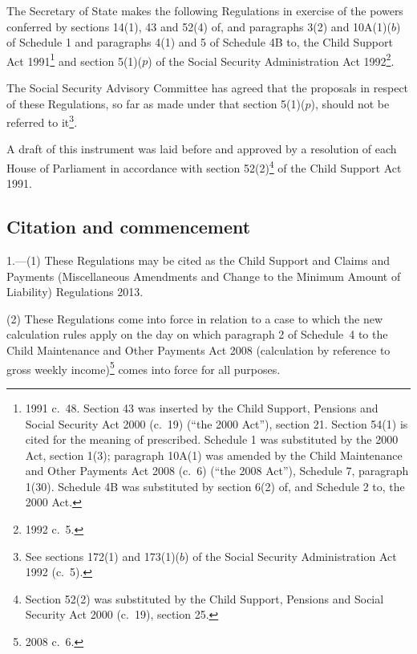 \documentclass[12pt,a4paper]{article}
\title{\regstitle}
\author{S.I.\ 2013 No.\ 1654}
\date{Made
3rd July 2013\\
Coming into force
in accordance with regulation 1
}
\begin{document}
\maketitle

\enlargethispage{\baselineskip}

\noindent
The Secretary of State makes the following Regulations in exercise of the powers conferred by sections 14(1), 43 and 52(4) of, and paragraphs 3(2) and 10A(1)($b$)  of Schedule 1 and paragraphs 4(1) and 5 of Schedule 4B to, the Child Support Act 1991\footnote{1991 c.~48. Section 43 was inserted by the Child Support, Pensions and Social Security Act 2000 (c.~19) (“the 2000 Act”), section 21. Section 54(1) is cited for the meaning of prescribed. Schedule 1 was substituted by the 2000 Act, section 1(3); paragraph 10A(1) was amended by the Child Maintenance and Other Payments Act 2008 (c.~6) (“the 2008 Act”), Schedule 7, paragraph 1(30). Schedule 4B was substituted by section 6(2) of, and Schedule 2 to, the 2000 Act.} and section 5(1)($p$)  of the Social Security Administration Act 1992\footnote{1992 c.~5.}.

The Social Security Advisory Committee has agreed that the proposals in respect of these Regulations, so far as made under that section 5(1)($p$), should not be referred to it\footnote{See sections 172(1) and 173(1)($b$)  of the Social Security Administration Act 1992 (c.~5).}.

A draft of this instrument was laid before and approved by a resolution of each House of Parliament in accordance with section 52(2)\footnote{Section 52(2) was substituted by the Child Support, Pensions and Social Security Act 2000 (c.~19), section 25.} of the Child Support Act 1991. 

{\sloppy

\tableofcontents

}

\bigskip

\setcounter{secnumdepth}{-2}

\subsection[1. Citation and commencement]{Citation and commencement}

1.---(1)  These Regulations may be cited as the Child Support and Claims and Payments (Miscellaneous Amendments and Change to the Minimum Amount of Liability) Regulations 2013.

(2) These Regulations come into force in relation to a case to which the new calculation rules apply on the day on which paragraph 2 of Schedule~4 to the Child Maintenance and Other Payments Act 2008 (calculation by reference to gross weekly income)\footnote{2008 c.~6.} comes into force for all purposes.
\end{document}
